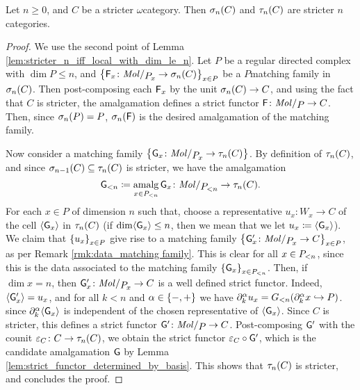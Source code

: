 \begin{lem} \label{lem:truncation_stricter_are_stricter}
    Let \( n \geq 0 \), and \( C \) be a stricter \( \omega \)\nbd category.
    Then \( \underlying{n}(C) \) and \( \trunc{n}(C) \) are stricter \( n \)\nbd categories.
\end{lem}
\begin{proof}
    We use the second point of Lemma \ref{lem:stricter_n_iff_local_with_dim_le_n}.
    Let \( P \) be a regular directed complex with \( \dim P \le n \), and \( \set{\F_x \colon \molecin{\imel{P}{x}} \to \underlying{n}(C)}_{x \in P} \) be a \( P \)\nbd matching family in \( \underlying{n}(C) \).
    Then post-composing each \( \F_x \) by the unit \( \underlying{n}(C) \to C \), and using the fact that \( C \) is stricter, the amalgamation defines a strict functor \( \F \colon \molecin{P} \to C \).
    Then, since \( \underlying{n}(P) = P \), \( \underlying{n}(\F) \) is the desired amalgamation of the matching family.

    Now consider a matching family \( \set{\G_x \colon \molecin{\imel{P}{x}} \to \trunc{n}(C)} \).
    By definition of \( \trunc{n}(C) \), and since \( \underlying{n - 1}(C) \subseteq \trunc{n}(C) \) is stricter, we have the amalgamation
    \begin{equation*}
        \gr{< n }{\G} \eqdef \amalg_{x \in \gr{< n}{P}} \G_x \colon \molecin{\gr{< n}{P}} \to \trunc{n}(C).
    \end{equation*}
    For each \( x \in P \) of dimension \( n \) such that, choose a representative \( u_x \colon W_x \to C \) of the cell \( \pcell{\G_x} \) in \( \trunc{n}(C) \) (if \( \dim \pcell{\G_x} \le n \), then we mean that we let \( u_x \eqdef \pcell{\G_x} \)).
    We claim that \( \set{u_x}_{x \in P} \) give rise to a matching family \( \set{\G'_x \colon \molecin{\imel{P}{x}} \to C}_{x \in P} \), as per Remark \ref{rmk:data_matching family}.
    This is clear for all \( x \in \gr{< n}{P} \), since this is the data associated to the matching family \( \set{\G_x}_{x \in \gr{< n}{P}} \). 
    Then, if \( \dim x = n \), then \( \G'_x \colon \molecin{\imel{P}{x}} \to C \) is a well defined strict functor.
    Indeed, \( \pcell{\G'_x} = u_x \), and for all \( k < n \) and \( \a \in \set{-, +} \) we have \( \bd{k}{\a} u_x = \gr{< n}{G}(\bd{k}{\a} x \incl P ) \).
    since \( \bd{k}{\a} \pcell{\G_x} \) is independent of the chosen representative of \( \pcell{\G_x} \).
    Since \( C \) is stricter, this defines a strict functor \( \G' \colon \molecin{P} \to C \). 
    Post-composing \( \G' \) with the counit \( \varepsilon_C \colon C \to \trunc{n}(C) \), we obtain the strict functor \( \varepsilon_C \after \G' \), which is the candidate amalgamation \( \G \) by Lemma \ref{lem:strict_functor_determined_by_basis}.
    This shows that \( \trunc{n}(C) \) is stricter, and concludes the proof.
\end{proof}

